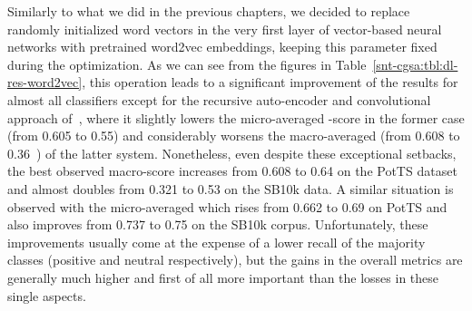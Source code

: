Similarly to what we did in the previous chapters, we decided to
replace randomly initialized word vectors in the very first layer of
vector-based neural networks with pretrained word2vec embeddings,
keeping this parameter fixed during the optimization.  As we can see
from the figures in Table~\ref{snt-cgsa:tbl:dl-res-word2vec}, this
operation leads to a significant improvement of the results for almost
all classifiers except for the recursive auto-encoder and
convolutional approach of~\citet{Severyn:15}, where it slightly lowers
the micro-averaged \F-score in the former case (from 0.605 to 0.55)
and considerably worsens the macro-averaged \F{} (from 0.608 to
0.36~\F) of the latter system.  Nonetheless, even despite these
exceptional setbacks, the best observed macro-score increases from
0.608 to 0.64 on the PotTS dataset and almost doubles from 0.321 to
0.53 on the SB10k data.  A similar situation is observed with the
micro-averaged \F{} which rises from 0.662 to 0.69 on PotTS and also
improves from 0.737 to 0.75 on the SB10k corpus.  Unfortunately, these
improvements usually come at the expense of a lower recall of the
majority classes (positive and neutral respectively), but the gains in
the overall metrics are generally much higher and first of all more
important than the losses in these single aspects.

